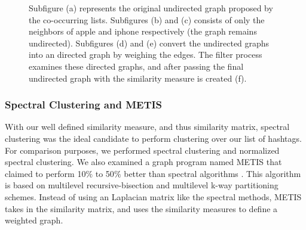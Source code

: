 \begin{figure}[tbh]
{}
\caption{Subfigure (a) represents the original undirected graph proposed by the co-occurring lists. Subfigures (b) and (c) consists of only the neighbors of apple and iphone respectively (the graph remains undirected). Subfigures (d) and (e) convert the undirected graphs into an directed graph by weighing the edges. The filter process examines these directed graphs, and after passing the final undirected graph with the similarity measure is created (f).}
\label{fig:words}
\end{figure}

\subsubsection{Spectral Clustering and METIS}
With our well defined similarity measure, and thus similarity matrix, spectral clustering was the ideal candidate to perform clustering over our list of hashtags. For comparison purposes, we performed spectral clustering and normalized spectral clustering. We also examined a graph program named METIS that claimed to perform 10$\%$ to 50$\%$ better than spectral algorithms \cite{Karypis1999}. This algorithm is based on multilevel recursive-bisection and multilevel k-way partitioning schemes. Instead of using an Laplacian matrix like the spectral methods, METIS takes in the similarity matrix, and uses the similarity measures to define a weighted graph.

